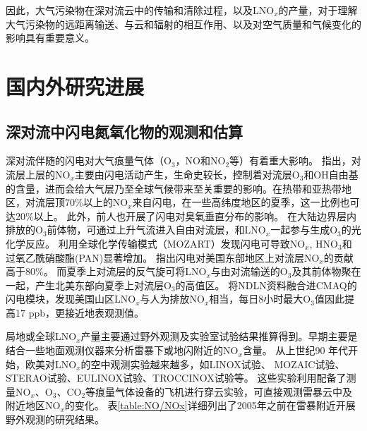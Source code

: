 因此，大气污染物在深对流云中的传输和清除过程，以及LNO$_x$的产量，对于理解大气污染物的远距离输送、与云和辐射的相互作用、以及对空气质量和气候变化的影响具有重要意义。



\section{国内外研究进展}

\subsection{深对流中闪电氮氧化物的观测和估算}

深对流伴随的闪电对大气痕量气体（O$_3$，NO和NO$_2$等）有着重大影响\citep{DeCaria.2005,Schumann.2007,Ott.2010,Banerjee.2014}。
\citet{Levy.1996}指出，对流层上层的NO$_x$主要由闪电活动产生，生命史较长，控制着对流层O$_3$和OH自由基的含量，进而会给大气层乃至全球气候带来至关重要的影响。在热带和亚热带地区，对流层顶70\%以上的NO$_x$来自闪电，在一些高纬度地区的夏季，这一比例也可达20\%以上\citep{Jourdain.2001,Martin.2002}。
此外，前人也开展了闪电对臭氧垂直分布的影响。
在大陆边界层内排放的O$_3$前体物，可通过上升气流进入自由对流层，和LNO$_x$一起参与生成O$_3$的光化学反应\citep{Bond.2002}。
\citet{Tie.2001}利用全球化学传输模式（MOZART）发现闪电可导致NO$_x$, HNO$_3$和过氧乙酰硝酸酯(PAN)显著增加。
\citet{Cooper.2009}指出闪电对美国东部地区上对流层NO$_x$的贡献高于80\%。
而夏季上对流层的反气旋可将LNO$_x$与由对流输送的O$_3$及其前体物聚在一起，产生北美东部向夏季上对流层O$_3$的高值区。
\citet{Kang.2020}将NDLN资料融合进CMAQ的闪电模块，发现美国山区LNO$_x$与人为排放NO$_x$相当，每日8小时最大O$_3$值因此提高17 ppb，更接近地表观测值。

局地或全球LNO$_x$产量主要通过野外观测及实验室试验结果推算得到。早期主要是结合一些地面观测仪器来分析雷暴下或地闪附近的NO$_x$含量。
从上世纪90 年代开始，欧美对LNO$_x$的空中观测实验越来越多，如LINOX试验\citep{Huntrieser.1998}、 MOZAIC试验\citep{Marenco.1998}、
STERAO试验\citep{Dye.2000}、EULINOX试验\citep{Holler.2000}、TROCCINOX试验\citep{Huntrieser.2007}等。
这些实验利用配备了测量NO$_x$、O$_3$、CO$_2$等痕量气体设备的飞机进行穿云实验，可直接观测雷暴云中及附近地区NO$_x$的变化。
表\ref{table:NO/NOx}详细列出了2005年之前在雷暴附近开展野外观测的研究结果。

